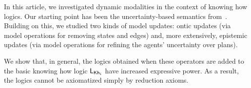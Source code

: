 \begin{comment}
In this paper we investigated dynamic modalities in the context of \emph{knowing how} logics. Our starting point has been the uncertainty-based semantics from~\cite{AFSVQ21,AFSVQ23report}. 
Building on this, we studied two forms of updates: ontic updates, via annoucement-like and arrow-update-like modalities; and epistemic updates, refining the perception of an agent regarding her own abilities. For the operators encompassed in the former family, we showed that in their general form, they increase the expressivity of the logic. Moreover, we restricted ourselves to a particular class of models and we provided axiomatizations via reduction axioms. For the latter family, we discussed some preliminary thoughts and semantic properties of each operator, and we discussed some limitations of this setting. Concretely, we showed that the presented logics lack uniform substitution, a typical property that is used to obtain complete axiomatizations. To deal with this issue, we presented an extended, underlying static language, and then proposed some dynamic modalities for epistemic updates. This contribution is completely novel with respect to~\cite{AFSV22}. Here, we presented a modality that makes a single plan  distinguishable from any other from the perspective of the agents. 
In this extended setting, apart from showing how it could be useful for the examples we introduced, we obtained sound and complete axiomatizations via reduction axioms, and showed that the satisfiability problem for these logics is decidable. 
\end{comment}

In this article, we investigated dynamic modalities in the context of knowing how logics. Our starting point has been the uncertainty-based semantics from~\cite{AFSVQ21,AFSVQ23report}. 
Building on this, we studied two kinds of model updates: ontic updates (via model operations for removing states and edges) and, more extensively, epistemic updates (via model operations for refining the agents' uncertainty over plans). 

We show that, in general, the logics obtained when these operators are added to the basic knowing how logic $\mathsf{L}_{{\sf Kh}_i}$ have increased expressive power.  As a result, the logics cannot be axiomatized simply by reduction axioms. 

